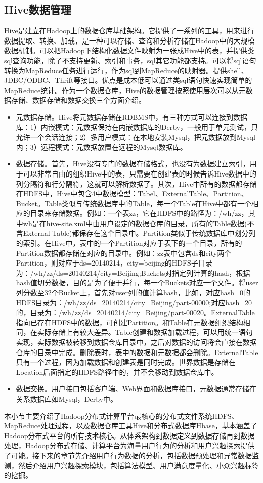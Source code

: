  \subsection{Hive数据管理}
  Hive是建立在Hadoop上的数据仓库基础架构。它提供了一系列的工具，用来进行数据提取、转换、加载，是一种可以存储、查询和分析存储在Hadoop中的大规模数据机制。可以把Hadoop下结构化数据文件映射为一张成Hive中的表，并提供类sql查询功能，除了不支持更新、索引和事务，sql其它功能都支持。可以将sql语句转换为MapReduce任务进行运行，作为sql到MapReduce的映射器。提供shell、JDBC/ODBC、Thrift等接口。优点是成本低可以通过类sql语句快速实现简单的MapReduce统计。作为一个数据仓库，Hive的数据管理按照使用层次可以从元数据存储、数据存储和数据交换三个方面介绍。
  \begin{itemize}
  \item 元数据存储。Hive将元数据存储在RDBMS中，有三种方式可以连接到数据库：1）内嵌模式：元数据保持在内嵌数据库的Derby，一般用于单元测试，只允许一个会话连接；2）多用户模式：在本地安装Mysql，把元数据放到Mysql内；3）远程模式：元数据放置在远程的Mysql数据库。
  \item 数据存储。首先，Hive没有专门的数据存储格式，也没有为数据建立索引，用于可以非常自由的组织Hive中的表，只需要在创建表的时候告诉Hive数据中的列分隔符和行分隔符，这就可以解析数据了。其次，Hive中所有的数据都存储在HDFS中，Hive中包含4中数据模型：Tabel、ExternalTable、Partition、Bucket。Table类似与传统数据库中的Table，每一个Table在Hive中都有一个相应的目录来存储数据。例如：一个表zz，它在HDFS中的路径为：/wh/zz，其中wh是在hive-site.xml中由用户设定的数据仓库的目录，所有的Table数据(不含External Table)都保存在这个目录中。Partition类似于传统数据库中划分列的索引。在Hive中，表中的一个Partition对应于表下的一个目录，所有的Partition数据都存储在对应的目录中。例如：zz表中包含ds和city两个Partition，则对应于ds=20140214，city=beijing的HDFS子目录为：/wh/zz/ds=20140214/city=Beijing;Buckets对指定列计算的hash，根据hash值切分数据，目的是为了便于并行，每一个Buckets对应一个文件。将user列分数至32个Bucket上，首先对user列的值计算hash，比如，对应hash=0的HDFS目录为：/wh/zz/ds=20140214/city=Beijing/part-00000;对应hash=20的，目录为：/wh/zz/ds=20140214/city=Beijing/part-00020。ExternalTable指向已存在HDFS中的数据，可创建Partition。和Table在元数据组织结构相同，在实际存储上有较大差异。Table创建和数据加载过程，可以用统一语句实现，实际数据被转移到数据仓库目录中，之后对数据的访问将会直接在数据仓库的目录中完成。删除表时，表中的数据和元数据都会删除。ExternalTable只有一个过程，因为加载数据和创建表是同时完成。世界数据是存储在Location后面指定的HDFS路径中的，并不会移动到数据仓库中。
  \item 数据交换。用户接口包括客户端、Web界面和数据库接口，元数据通常存储在关系数据库如Mysql，Derby中。
  \end{itemize}
本小节主要介绍了Hadoop分布式计算平台最核心的分布式文件系统HDFS、MapReduce处理过程，以及数据仓库工具Hive和分布式数据库Hbase，基本涵盖了Hadoop分布式平台的所有技术核心。从体系架构到数据定义到数据存储再到数据处理，Hadoop分布式存储、计算平台为海量用户行为的分析和用户兴趣探索提供了可能。接下来的章节先介绍用户行为数据的分析，包括数据预处理和异常数据监测，然后介绍用户兴趣探索模块，包括算法模型、用户满意度量化、小众兴趣标签的挖掘。

